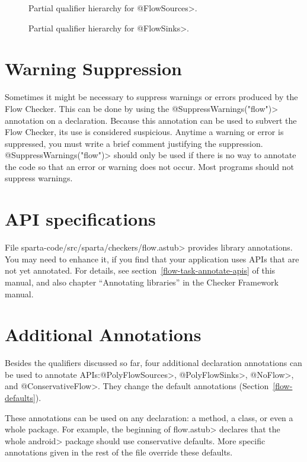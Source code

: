 \begin{figure}[h]
\caption{Partial qualifier hierarchy for \<@FlowSources>.}
\label{fig:flowsources-hierarchy}
\end{figure}

\begin{figure}[h]
\caption{Partial qualifier hierarchy for \<@FlowSinks>.}
\label{fig:flowsinks-hierarchy}
\end{figure}
 
 \section{Warning Suppression}
 
 Sometimes it might be necessary to suppress warnings or errors produced by the
  Flow Checker.  This can be done by using the  \<@SuppressWarnings("flow")> annotation
   on a declaration.  Because this annotation can be used to subvert the Flow Checker, its use
   is considered suspicious.  Anytime a warning or error is suppressed, you must 
   write a brief comment justifying the suppression.     \<@SuppressWarnings("flow")> should
   only be used if there is no way to annotate the code so that an error or warning does not occur. 
   Most programs should not suppress warnings. 
\section{API specifications}

File \<sparta-code/src/sparta/checkers/flow.astub> provides library
annotations.  You may need to enhance it, if you find that your application
uses APIs that are not yet annotated.  For details, see
section~\ref{flow-task-annotate-apis} of this manual, and also 
chapter
``Annotating libraries'' in the Checker Framework manual.

\section{Additional Annotations}
Besides the qualifiers discussed so far, four additional declaration
annotations can be used to annotate APIs:\<@PolyFlowSources>,
 \<@PolyFlowSinks>, \<@NoFlow>, and \<@ConservativeFlow>. 
 They change the default annotations (Section~\ref{flow-defaults}).
 
 These annotations can be used on any declaration: a method, a class,
or even a whole package.
For example, the beginning of \<flow.astub> declares that the
whole \<android> package should use conservative defaults.
More specific annotations given in the rest of the file override these
defaults.
 

